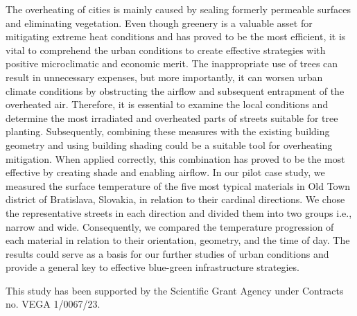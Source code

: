 \noindent

The overheating of cities is mainly caused by sealing formerly permeable surfaces and eliminating vegetation. Even though greenery is a valuable asset for mitigating extreme heat conditions and has proved to be the most efficient, it is vital to comprehend the urban conditions to create effective strategies with positive microclimatic and economic merit. The inappropriate use of trees can result in unnecessary expenses, but more importantly, it can worsen urban climate conditions by obstructing the airflow and subsequent entrapment of the overheated air. Therefore, it is essential to examine the local conditions and determine the most irradiated and overheated parts of streets suitable for tree planting. Subsequently, combining these measures with the existing building geometry and using building shading could be a suitable tool for overheating mitigation. When applied correctly, this combination has proved to be the most effective by creating shade and enabling airflow. In our pilot case study, we measured the surface temperature of the five most typical materials in Old Town district of Bratislava, Slovakia, in relation to their cardinal directions. We chose the representative streets in each direction and divided them into two groups i.e., narrow and wide. Consequently, we compared the temperature progression of each material in relation to their orientation, geometry, and the time of day. The results could serve as a basis for our further studies of urban conditions and provide a general key to effective blue-green infrastructure strategies.

This study has been supported by the Scientific Grant Agency under Contracts no. VEGA 1/0067/23.





\newpage{}
{}
\begin{flushleft}





\end{flushleft}

